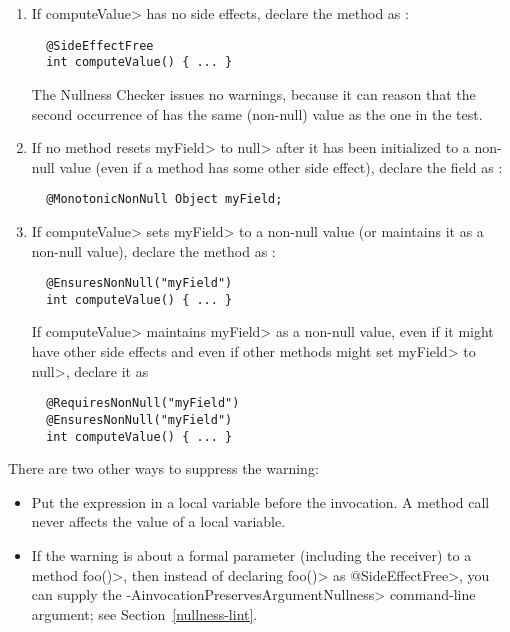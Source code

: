 \begin{enumerate}
\item
  If \<computeValue> has no side effects, declare the method as
  :

\begin{Verbatim}
  @SideEffectFree
  int computeValue() { ... }
\end{Verbatim}

\noindent
The Nullness Checker issues no warnings, because it can reason that
the second occurrence of  has the same (non-null) value as
the one in the test.

\item
  If no method resets \<myField> to \<null> after it has been initialized
  to a non-null value (even if a method has some other side effect),
  declare the field as :

\begin{Verbatim}
  @MonotonicNonNull Object myField;
\end{Verbatim}

\item
  If \<computeValue> sets \<myField> to a non-null value (or maintains it
  as a non-null value), declare the method as
  :

\begin{Verbatim}
  @EnsuresNonNull("myField")
  int computeValue() { ... }
\end{Verbatim}

  If \<computeValue> maintains \<myField> as a non-null value, even if it
  might have other side effects and even if other methods might set
  \<myField> to \<null>, declare it as

\begin{Verbatim}
  @RequiresNonNull("myField")
  @EnsuresNonNull("myField")
  int computeValue() { ... }
\end{Verbatim}
\end{enumerate}

There are two other ways to suppress the warning:

\begin{itemize}
\item
  Put the expression in a local variable before the invocation.  A method
  call never affects the value of a local variable.
\item
  If the warning is about a formal parameter (including the receiver) to a
  method \<foo()>, then instead of declaring \<foo()> as
  \<@SideEffectFree>, you can supply the
  \<-AinvocationPreservesArgumentNullness> command-line argument; see
  Section~\ref{nullness-lint}.
\end{itemize}


